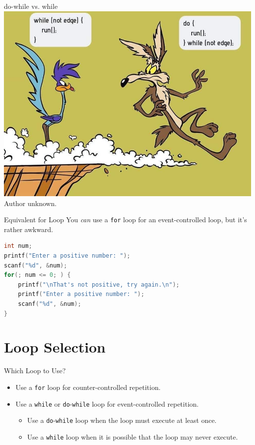 \documentclass[graphics]{beamer}
\begin{document}
\begin{frame}{do-while vs. while}
    \centering
    \includegraphics[scale=0.3]{L11_MoreLoops/do_while.png} \\
    \footnotesize Author unknown.
\end{frame}

\begin{frame}[fragile]{Equivalent for Loop}
    You \textit{can} use a \texttt{for} loop for an event-controlled loop, but it's rather awkward.
    \begin{lstlisting}[language=C,basicstyle=\footnotesize,keywordstyle=\color{blue},commentstyle=\color{green},showstringspaces=false,stringstyle=\color{red}]
int num;
printf("Enter a positive number: ");
scanf("%d", &num);
for(; num <= 0; ) {
    printf("\nThat's not positive, try again.\n");
    printf("Enter a positive number: ");
    scanf("%d", &num);
}
    \end{lstlisting}
\end{frame}

\section*{Loop Selection}
\begin{frame}{Which Loop to Use?}
    \begin{itemize}
        \item Use a \texttt{for} loop for counter-controlled repetition.
        \item Use a \texttt{while} or \texttt{do}-\texttt{while} loop for event-controlled repetition.
        \begin{itemize}
            \item Use a \texttt{do}-\texttt{while} loop when the loop must execute at least once.
            \item Use a \texttt{while} loop when it is possible that the loop may never execute.
        \end{itemize}
    \end{itemize}
\end{frame}
\end{document}

